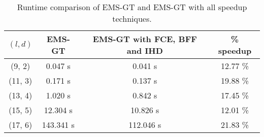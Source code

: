 \begin{table}[h] %
	\renewcommand{\arraystretch}{1.3}
	\centering
	\begin{tabular}{|c|c|c|c|}
	\hline 
	\bfseries\boldmath $(l,d)$ & 
	\bfseries\boldmath EMS-GT & 
	\bfseries\boldmath EMS-GT with FCE, BFF and IHD & 
	\bfseries \% speedup\\
	\hline
	(9, 2) & 0.047 s &		0.041 s 	&	12.77 \%\\
	(11, 3) & 0.171 s &		0.137 s 	&	19.88 \%\\
	(13, 4) & 1.020 s &		0.842 s 	&	17.45 \%\\
	(15, 5) & 12.304 s &	10.826 s  	&	12.01 \%\\
	(17, 6) & 143.341 s &	112.046 s 	&	21.83 \%\\
	\hline\end{tabular}
	
	\caption{Runtime comparison of EMS-GT and EMS-GT with all speedup techniques.}
	\label{tbl:ems-gt-all-speedup}
\end{table}


